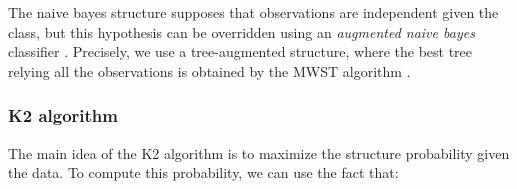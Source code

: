 
The naive bayes structure supposes that observations are independent given the class, but this hypothesis can be overridden using an \emph{augmented naive bayes} classifier \cite{Keo99,Fri97b}. Precisely, we use a tree-augmented structure, where the best tree relying all the observations is obtained by the MWST algorithm \cite{Gei92}.
\vspace*{-1.25\baselineskip}


\subsubsection{K2 algorithm}

The main idea of the K2 algorithm is to maximize the structure probability given the data.
To compute this probability, we can use the fact that:

